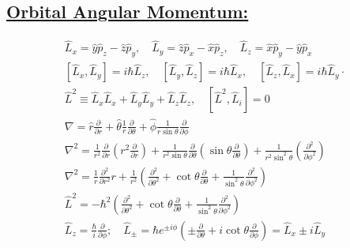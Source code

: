 \subsection*{\underline{Orbital Angular Momentum:}}
\begin{gather}
    \hat{L}_{x}=\hat{y} \hat{p}_{z}-\hat{z} \hat{p}_{y}, \quad \hat{L}_{y}=\hat{z} \hat{p}_{x}-\hat{x} \hat{p}_{z}, \quad \hat{L}_{z}=\hat{x} \hat{p}_{y}-\hat{y} \hat{p}_{x} \\
    {\left[\hat{L}_{x}, \hat{L}_{y}\right]=i \hbar \hat{L}_{z}, \quad\left[\hat{L}_{y}, \hat{L}_{z}\right]=i \hbar \hat{L}_{x}, \quad\left[\hat{L}_{z}, \hat{L}_{x}\right]=i \hbar \hat{L}_{y} \cdot} \\
    \hat{L}^{2} \equiv \hat{L}_{x} \hat{L}_{x}+\hat{L}_{y} \hat{L}_{y}+\hat{L}_{z} \hat{L}_{z}, \quad\left[\hat{L}^{2}, \hat{L}_{i}\right]=0 \\
    \nabla=\hat{r}\frac{\partial}{\partial r}+\hat{\theta}\frac{1}{r}\frac{\partial}{\partial \theta}+\hat{\phi}\frac{1}{r\sin\theta}\frac{\partial}{\partial \phi}\\
    \nabla^{2}=\frac{1}{r^2} \frac{\partial}{\partial r}\left( r^2\frac{\partial}{\partial r} \right)
    +\frac{1}{r^{2}\sin\theta}\frac{\partial}{\partial \theta}\left( \sin\theta\frac{\partial}{\partial\theta} \right)
    +\frac{1}{r^{2}\sin^2\theta} \left( \frac{\partial^{2}}{\partial \phi^{2}} \right)\\
    \nabla^{2}=\frac{1}{r} \frac{\partial^{2}}{\partial r^{2}} r+\frac{1}{r^{2}}\left(\frac{\partial^{2}}{\partial \theta^{2}}+\cot \theta \frac{\partial}{\partial \theta}+\frac{1}{\sin ^{2} \theta} \frac{\partial^{2}}{\partial \phi^{2}}\right) \\
    \hat{L}^{2}=-\hbar^{2}\left(\frac{\partial^{2}}{\partial \theta^{2}}+\cot \theta \frac{\partial}{\partial \theta}+\frac{1}{\sin ^{2} \theta} \frac{\partial^{2}}{\partial \phi^{2}}\right) \\
    \hat{L}_{z}=\frac{\hbar}{i} \frac{\partial}{\partial \phi} ; \quad \hat{L}_{\pm}=\hbar e^{\pm i \phi}\left(\pm \frac{\partial}{\partial \theta}+i \cot \theta \frac{\partial}{\partial \phi}\right)=\hat{L}_{x}\pm i\hat{L}_{y}
\end{gather}

